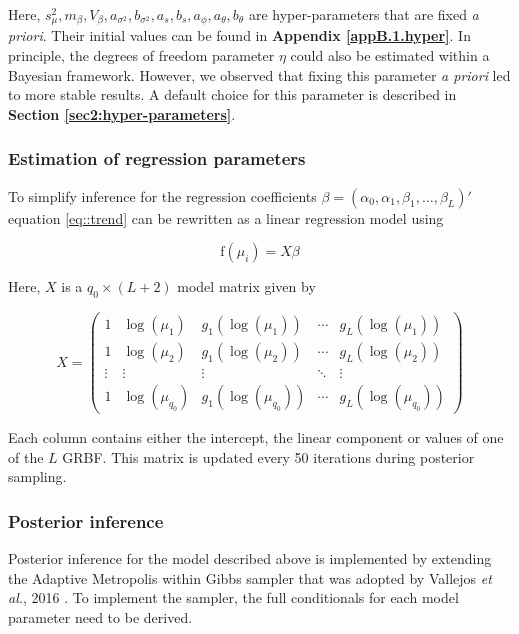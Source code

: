 Here, $s^2_{\mu}, m_\beta, V_\beta, a_{\sigma^2}, b_{\sigma^2}, a_s, b_s, a_\phi, a_\theta, b_\theta$ are hyper-parameters that are fixed \emph{a priori}. 
Their initial values can be found in \textbf{Appendix \ref{appB.1.hyper}}. 
In principle, the degrees of freedom parameter $\eta$ could also be estimated within a Bayesian framework. 
However, we observed that fixing this parameter \emph{a priori} led to more stable results. 
A default choice for this parameter is described in \textbf{Section \ref{sec2:hyper-parameters}}.

\newpage

\subsubsection{Estimation of regression parameters}

To simplify inference for the regression coefficients $\beta = (\alpha_0, \alpha_1, \beta_1, \ldots, \beta_L)'$ equation \eqref{eq::trend} can be rewritten as a linear regression model using 

\begin{equation} \label{eq::trend2} 
\text{f}(\mu_i) = X \beta
\end{equation} 

Here, $X$ is a $q_0 \times (L+2)$ model matrix given by 

\begin{equation} \label{eq::X} X = \left( \begin{array}{ccccc}
1 & \log(\mu_1) & g_1(\log(\mu_1)) & \cdots & g_L(\log(\mu_1)) \\
1 & \log(\mu_2) & g_1(\log(\mu_2)) & \cdots & g_L(\log(\mu_2)) \\
\vdots & \vdots & \vdots & \ddots & \vdots  \\
1 & \log(\mu_{q_0}) & g_1(\log(\mu_{q_0})) & \cdots & g_L(\log(\mu_{q_0}))
\end{array}\right)
\end{equation}

Each column contains either the intercept, the linear component or values of one of the $L$ GRBF. 
This matrix is updated every 50 iterations during posterior sampling.

\subsubsection{Posterior inference}

Posterior inference for the model described above is implemented by extending the Adaptive Metropolis within Gibbs sampler \citep{Roberts2009} that was adopted by Vallejos \emph{et al.}, 2016 \cite{Vallejos2016}. 
To implement the sampler, the full conditionals for each model parameter need to be derived. \\


